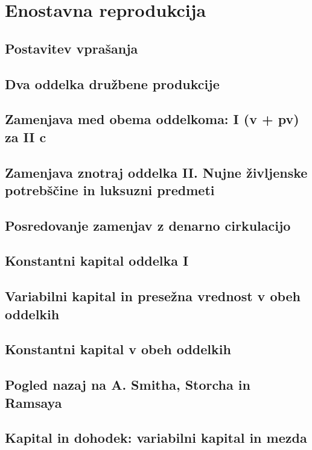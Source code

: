 \documentclass[a5paper]{scrbook}
\begin{document}
\chapter{Enostavna reprodukcija}

\section{Postavitev vprašanja}

\section{Dva oddelka družbene produkcije}

\section{Zamenjava med obema oddelkoma: I (v + pv) za II c}

\section{Zamenjava znotraj oddelka II. Nujne življenske potrebščine in luksuzni predmeti}

\section{Posredovanje zamenjav z denarno cirkulacijo}

\section{Konstantni kapital oddelka I}

\section{Variabilni kapital in presežna vrednost v obeh oddelkih}

\section{Konstantni kapital v obeh oddelkih}

\section{Pogled nazaj na A. Smitha, Storcha in Ramsaya}

\section{Kapital in dohodek: variabilni kapital in mezda}
\end{document}
